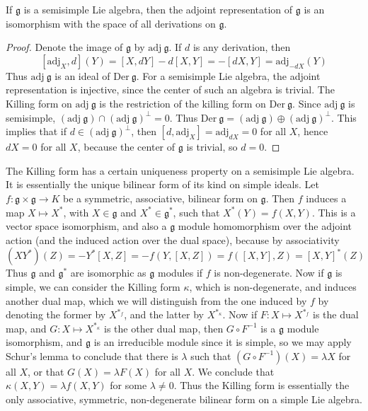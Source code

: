 \begin{theorem}
    If $\mathfrak{g}$ is a semisimple Lie algebra, then the adjoint representation of $\mathfrak{g}$ is an isomorphism with the space of all derivations on $\mathfrak{g}$.
\end{theorem}
\begin{proof}
    Denote the image of $\mathfrak{g}$ by $\text{adj}\ \mathfrak{g}$. If $d$ is any derivation, then
    \[ [\text{adj}_X, d](Y) = [X,dY] - d[X,Y] = -[dX,Y] = \text{adj}_{-dX}(Y) \]
    Thus $\text{adj}\ \mathfrak{g}$ is an ideal of $\text{Der}\ \mathfrak{g}$. For a semisimple Lie algebra, the adjoint representation is injective, since the center of such an algebra is trivial. The Killing form on $\text{adj}\ \mathfrak{g}$ is the restriction of the killing form on $\text{Der}\ \mathfrak{g}$. Since $\text{adj}\ \mathfrak{g}$ is semisimple, $(\text{adj}\ \mathfrak{g}) \cap (\text{adj}\ \mathfrak{g})^\perp = 0$. Thus $\text{Der}\ \mathfrak{g} = (\text{adj}\ \mathfrak{g}) \oplus (\text{adj}\ \mathfrak{g})^\perp$. This implies that if $d \in (\text{adj}\ \mathfrak{g})^\perp$, then $[d,\text{adj}_X] = \text{adj}_{dX} = 0$ for all $X$, hence $dX = 0$ for all $X$, because the center of $\mathfrak{g}$ is trivial, so $d = 0$.
\end{proof}

The Killing form has a certain uniqueness property on a semisimple Lie algebra. It is essentially the unique bilinear form of its kind on simple ideals. Let $f: \mathfrak{g} \times \mathfrak{g} \to K$ be a symmetric, associative, bilinear form on $\mathfrak{g}$. Then $f$ induces a map $X \mapsto X^*$, with $X \in \mathfrak{g}$ and $X^* \in \mathfrak{g}^*$, such that $X^*(Y) = f(X,Y)$. This is a vector space isomorphism, and also a $\mathfrak{g}$ module homomorphism over the adjoint action (and the induced action over the dual space), because by associativity
%
\[ (XY^*)(Z) = -Y^*[X,Z] = -f(Y,[X,Z]) = f([X,Y],Z) = [X,Y]^*(Z) \]
%
Thus $\mathfrak{g}$ and $\mathfrak{g}^*$ are isomorphic as $\mathfrak{g}$ modules if $f$ is non-degenerate. Now if $\mathfrak{g}$ is simple, we can consider the Killing form $\kappa$, which is non-degenerate, and induces another dual map, which we will distinguish from the one induced by $f$ by denoting the former by $X^{*_f}$, and the latter by $X^{*_\kappa}$. Now if $F: X \mapsto X^{*_f}$ is the dual map, and $G: X \mapsto X^{*_\kappa}$ is the other dual map, then $G \circ F^{-1}$ is a $\mathfrak{g}$ module isomorphism, and $\mathfrak{g}$ is an irreducible module since it is simple, so we may apply Schur's lemma to conclude that there is $\lambda$ such that $(G \circ F^{-1})(X) = \lambda X$ for all $X$, or that $G(X) = \lambda F(X)$ for all $X$. We conclude that $\kappa(X,Y) = \lambda f(X,Y)$ for some $\lambda \neq 0$. Thus the Killing form is essentially the only associative, symmetric, non-degenerate bilinear form on a simple Lie algebra.

